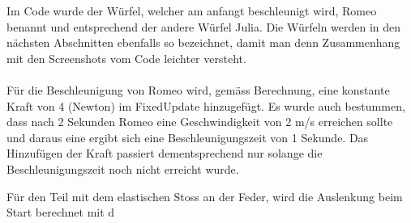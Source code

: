 \documentclass[../main.tex]{subfiles}
\begin{document}
Im Code wurde der Würfel, welcher am anfangt beschleunigt wird, Romeo benannt und entsprechend der andere Würfel Julia. Die Würfeln werden in den nächsten Abschnitten ebenfalls so bezeichnet, damit man denn Zusammenhang mit den Screenshots vom Code leichter versteht. 
\\
\\
Für die Beschleunigung von Romeo wird, gemäss Berechnung, eine konstante Kraft von 4 (Newton) im FixedUpdate hinzugefügt. Es wurde auch bestummen, dass nach 2 Sekunden Romeo eine Geschwindigkeit von 2 m/s erreichen sollte und daraus eine ergibt sich eine Beschleunigungszeit von 1 Sekunde. Das Hinzufügen der Kraft passiert dementsprechend nur solange die Beschleunigungszeit noch nicht erreicht wurde.

Für den Teil mit dem elastischen Stoss an der Feder, wird die Auslenkung beim Start berechnet mit d
\end{document}

